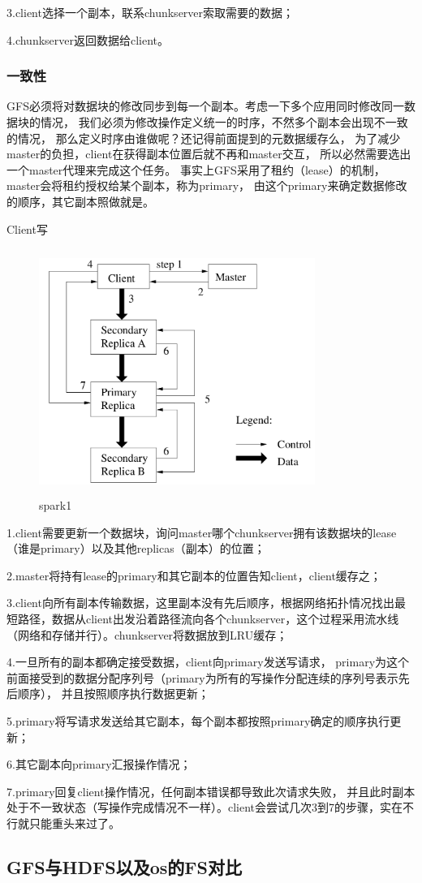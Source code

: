 3.client选择一个副本，联系chunkserver索取需要的数据；

4.chunkserver返回数据给client。

\subsubsection{一致性}
GFS必须将对数据块的修改同步到每一个副本。考虑一下多个应用同时修改同一数据块的情况，
我们必须为修改操作定义统一的时序，不然多个副本会出现不一致的情况，
那么定义时序由谁做呢？还记得前面提到的元数据缓存么，
为了减少master的负担，client在获得副本位置后就不再和master交互，
所以必然需要选出一个master代理来完成这个任务。
事实上GFS采用了租约（lease）的机制，master会将租约授权给某个副本，称为primary，
由这个primary来确定数据修改的顺序，其它副本照做就是。

Client写
\begin{figure}[!h]
    \centering
    \includegraphics[height=8cm,width= 9cm]{img/gfs_write.png}
    \caption{spark1}
\label{spark1}
\end{figure}

1.client需要更新一个数据块，询问master哪个chunkserver拥有该数据块的lease（谁是primary）以及其他replicas（副本）的位置；

2.master将持有lease的primary和其它副本的位置告知client，client缓存之；

3.client向所有副本传输数据，这里副本没有先后顺序，根据网络拓扑情况找出最短路径，数据从client出发沿着路径流向各个chunkserver，这个过程采用流水线（网络和存储并行）。chunkserver将数据放到LRU缓存；

4.一旦所有的副本都确定接受数据，client向primary发送写请求，
primary为这个前面接受到的数据分配序列号（primary为所有的写操作分配连续的序列号表示先后顺序），
并且按照顺序执行数据更新；

5.primary将写请求发送给其它副本，每个副本都按照primary确定的顺序执行更新；

6.其它副本向primary汇报操作情况；

7.primary回复client操作情况，任何副本错误都导致此次请求失败，
并且此时副本处于不一致状态（写操作完成情况不一样）。client会尝试几次3到7的步骤，实在不行就只能重头来过了。

\subsection{GFS与HDFS以及os的FS对比}


